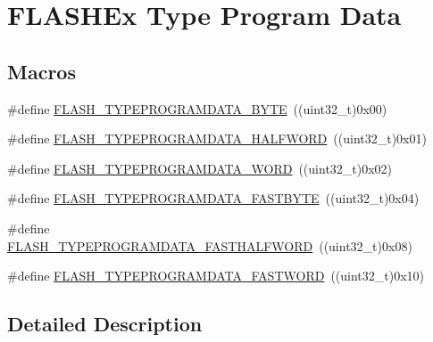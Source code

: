 \hypertarget{group___f_l_a_s_h_ex___type___program___data}{\section{F\-L\-A\-S\-H\-Ex Type Program Data}
\label{group___f_l_a_s_h_ex___type___program___data}
}
\subsection*{Macros}
\begin{DoxyCompactItemize}
\item 
\#define \hyperlink{group___f_l_a_s_h_ex___type___program___data_ga582ae928284a107072cc9d2964081f14}{F\-L\-A\-S\-H\-\_\-\-T\-Y\-P\-E\-P\-R\-O\-G\-R\-A\-M\-D\-A\-T\-A\-\_\-\-B\-Y\-T\-E}~((uint32\-\_\-t)0x00)
\item 
\#define \hyperlink{group___f_l_a_s_h_ex___type___program___data_ga5273725206e7d7cda74148ba90c51c9f}{F\-L\-A\-S\-H\-\_\-\-T\-Y\-P\-E\-P\-R\-O\-G\-R\-A\-M\-D\-A\-T\-A\-\_\-\-H\-A\-L\-F\-W\-O\-R\-D}~((uint32\-\_\-t)0x01)
\item 
\#define \hyperlink{group___f_l_a_s_h_ex___type___program___data_ga84c4bbdde2127c45ff1dba539b96397f}{F\-L\-A\-S\-H\-\_\-\-T\-Y\-P\-E\-P\-R\-O\-G\-R\-A\-M\-D\-A\-T\-A\-\_\-\-W\-O\-R\-D}~((uint32\-\_\-t)0x02)
\item 
\#define \hyperlink{group___f_l_a_s_h_ex___type___program___data_ga991d2185fe7d6687bf9f74e305fa9388}{F\-L\-A\-S\-H\-\_\-\-T\-Y\-P\-E\-P\-R\-O\-G\-R\-A\-M\-D\-A\-T\-A\-\_\-\-F\-A\-S\-T\-B\-Y\-T\-E}~((uint32\-\_\-t)0x04)
\item 
\#define \hyperlink{group___f_l_a_s_h_ex___type___program___data_ga06b94dbaa93b2bdd94a4e8b48cbf5770}{F\-L\-A\-S\-H\-\_\-\-T\-Y\-P\-E\-P\-R\-O\-G\-R\-A\-M\-D\-A\-T\-A\-\_\-\-F\-A\-S\-T\-H\-A\-L\-F\-W\-O\-R\-D}~((uint32\-\_\-t)0x08)
\item 
\#define \hyperlink{group___f_l_a_s_h_ex___type___program___data_ga7223e44f993459e906d19748753e7780}{F\-L\-A\-S\-H\-\_\-\-T\-Y\-P\-E\-P\-R\-O\-G\-R\-A\-M\-D\-A\-T\-A\-\_\-\-F\-A\-S\-T\-W\-O\-R\-D}~((uint32\-\_\-t)0x10)
\end{DoxyCompactItemize}


\subsection{Detailed Description}


